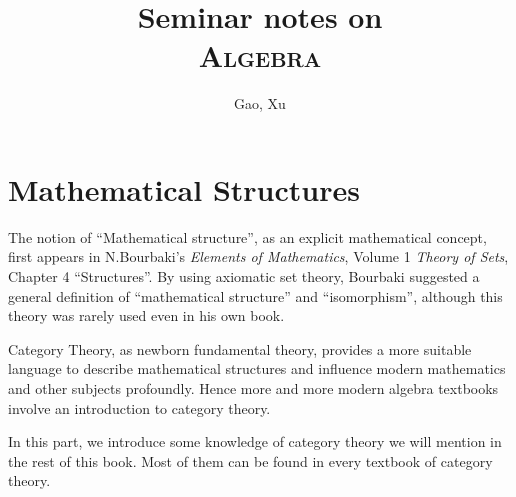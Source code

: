 %
%
%
%

%
%

%
%
%
%
\title{{\giant Seminar notes on}\\ \Giant\textsc{Algebra}}
\author{Gao, Xu}
\date{}


\frontmatter
\maketitle
\dominitoc

\tableofcontents
\mainmatter
\pagestyle{plain}
\setcounter{minitocdepth}{2}
\part{Mathematical Structures}
  The notion of ``Mathematical structure'', as an explicit mathematical concept, first appears in N.Bourbaki's \emph{Elements of Mathematics}, Volume 1 \emph{Theory of Sets}, Chapter 4 ``Structures''. By using axiomatic set theory, Bourbaki suggested a general definition of ``mathematical structure'' and ``isomorphism'', although this theory was rarely used even in his own book.

  Category Theory, as newborn fundamental theory, provides a more suitable language to describe mathematical structures and influence modern mathematics and other subjects profoundly. Hence more and more modern algebra textbooks involve an introduction to category theory.

  In this part, we introduce some knowledge of category theory we will mention in the rest of this book. Most of them can be found in every textbook of category theory.

